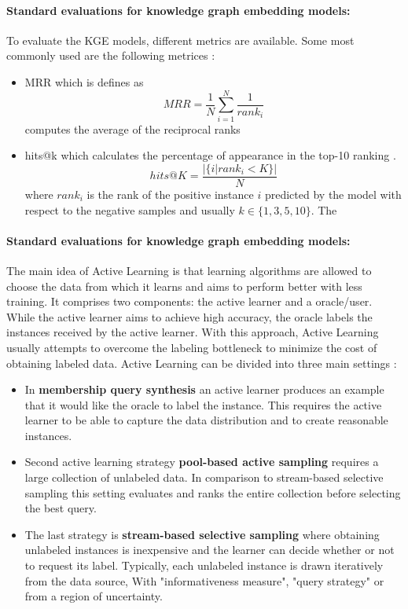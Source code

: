 \paragraph{\textbf{Standard evaluations for knowledge graph embedding models:}}  
To evaluate the \ac{KGE} models, different metrics are available.
Some most commonly used are the following metrices \cite{kotnis2017analysis}:
\begin{itemize}
    \item 
    \ac{MRR} which is defines as
    $$MRR = \frac{1}{N} \sum_{i=1}^{N}\frac{1}{rank_i}$$
    computes the average of the reciprocal ranks \cite{zhang2021efficient}
    
    \item 
    hits@k which calculates the percentage of appearance in the top-10
ranking \cite{zhang2021efficient}.
    $$hits@K = \frac{|\{i | rank_i < K\}|}{N}$$
    where $rank_i$ is the rank of the positive instance $i$ predicted by the
    model with respect to the negative samples and usually $k \in \{1,3,5,10\}$.
    The 
\end{itemize}

\paragraph{\textbf{Standard evaluations for knowledge graph embedding models:}}
The main idea of Active Learning is that learning algorithms are allowed to choose the data from which it learns and aims to perform better with less training.
It comprises two components: the active learner and a oracle/user.
While the active learner aims to achieve high accuracy, the oracle labels the instances received by the active learner.
With this approach, Active Learning usually attempts to overcome the labeling bottleneck to minimize the cost of obtaining labeled data.
Active Learning can be divided into three main settings \cite{Settles2009ActiveLL}:
\begin{itemize}
    \item 
    In \textbf{membership query synthesis} an active learner produces an example that it would like the oracle to label the instance.
    This requires the active learner to be able to capture the data distribution and to create reasonable instances.
    
    \item 
    Second active learning strategy  \textbf{pool-based active sampling} requires a large collection of unlabeled data.
    In comparison to stream-based selective sampling this setting evaluates and ranks the entire collection before selecting the best query.
    
    \item 
    The last strategy is \textbf{stream-based selective sampling} where obtaining unlabeled instances is inexpensive and the learner can decide whether or not to request its label.
    Typically, each unlabeled instance is drawn iteratively from the data source,
    With "informativeness measure", "query strategy" or from a region of uncertainty.
\end{itemize}


